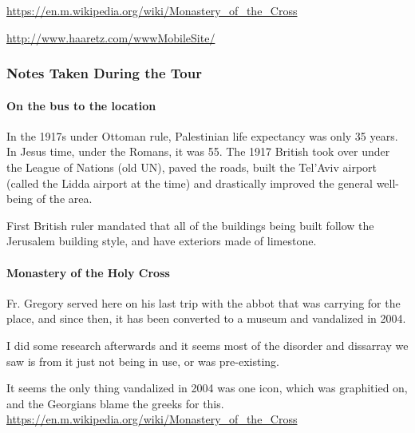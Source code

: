 \documentclass[letterpaper]{report}
\begin{document}
\begin{multicols}{2}
\url{https://en.m.wikipedia.org/wiki/Monastery_of_the_Cross}

\url{http://www.haaretz.com/wwwMobileSite/}

\subsubsection{Notes Taken During the Tour}

\paragraph{On the bus to the location}
In the 1917s under Ottoman rule, Palestinian life expectancy was only 35 years. In Jesus time, under the Romans, it was 55. The 1917 British took over under the League of Nations (old UN), paved the roads, built the Tel'Aviv airport (called the Lidda airport at the time) and drastically improved the general well-being of the area.

First British ruler mandated that all of the buildings being built follow the Jerusalem building style, and have exteriors made of limestone.

\paragraph{Monastery of the Holy Cross}
Fr. Gregory served here on his last trip with the abbot that was carrying for the place, and since then, it has been converted to a museum and vandalized in 2004.

I did some research afterwards and it seems most of the disorder and dissarray we saw is from it just not being in use,
or was pre-existing.

It seems the only thing vandalized in 2004 was one icon, which was graphitied on,
and the Georgians blame the greeks for this.
\url{https://en.m.wikipedia.org/wiki/Monastery_of_the_Cross}

\end{multicols}

\clearpage
\end{document}
